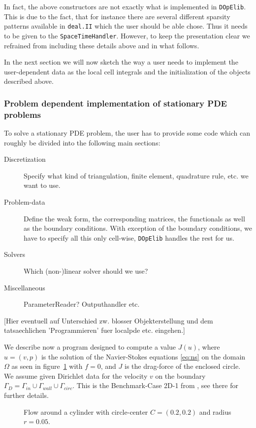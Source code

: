 \documentclass[prodmode,acmtoms]{acmsmall}
\numberwithin{equation}{section}
\newcommand{\deal}{\texttt{deal.II}}
\newcommand{\dope}{\texttt{DOpElib}}
\begin{document}
\begin{remark}
In fact, the above constructors are not exactly what is implemented in \dope{}.
This is due to the fact, that for instance 
there are several different sparsity patterns available in 
\deal{} which the user should be able chose. Thus it needs to be 
given to the \texttt{SpaceTimeHandler}. However, to keep the 
presentation clear we refrained from including these details above and in
what follows.
\end{remark} 

In the next section we will now sketch the way a user needs to implement the
user-dependent data as the local cell integrals and the initialization of the
objects described above.
\subsubsection{Problem dependent implementation of stationary PDE problems}
To solve a stationary PDE problem, the user has to provide some code which can roughly be divided into the following main sections:
\begin{description}
\item[Discretization] Specify what kind of triangulation, finite element, quadrature rule, etc. we want to use.
\item[Problem-data] Define the weak form, the corresponding matrices, the functionals as well as the boundary conditions. With exception of the boundary conditions, we have to specify all this only cell-wise, \dope{} handles the rest for us.
\item[Solvers] Which (non-)linear solver should we use? 
\item[Miscellaneous] ParameterReader? Outputhandler etc.
\end{description} 
[Hier eventuell auf Unterschied zw. blosser Objekterstellung und dem tatsaechlichen 'Programmieren' fuer localpde etc. eingehen.]

We describe now a program designed to compute a value $J(u)$, where $u=(v,p)$ is the solution of the Navier-Stokes equations \eqref{eq:ns} on the domain $\Omega$ as seen in figure~\ref{fig:example_ns} with  $f=0$, and $J$ is the drag-force of the enclosed circle. We assume given Dirichlet data for the velocity $v$ on the boundary $\Gamma_{D}=\Gamma_{in}\cup\Gamma_{wall}\cup\Gamma_{circ}$. This is the Benchmark-Case 2D-1 from \cite{TuSchae96}, see there for further details.
\begin{figure}[h]
\centering
\resizebox{0.5\textwidth}{!}{}
\caption{Flow around a cylinder with 
circle-center $C=(0.2,0.2)$ and radius $r=0.05$.}
\label{fig:example_ns}
\end{figure}
\end{document}
